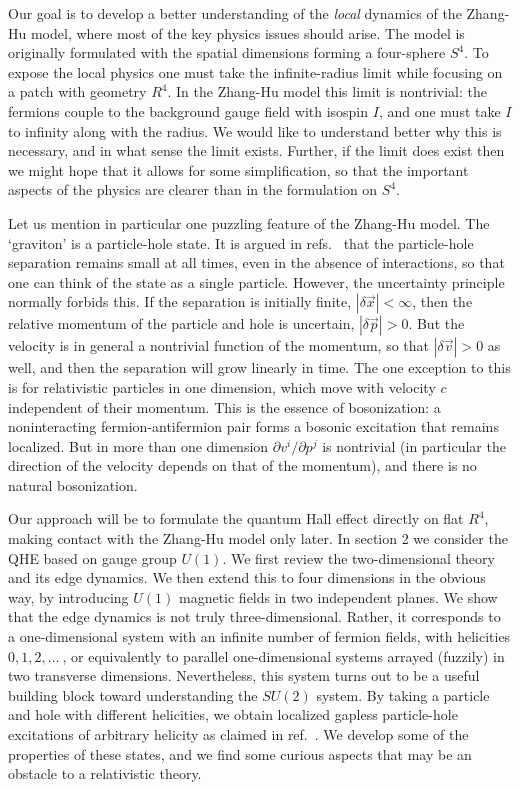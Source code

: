 \documentclass[a4paper,12pt]{article}
\newcommand{\R}{R}
\begin{document}
Our goal is to develop a better understanding of the {\it local}
dynamics of the Zhang-Hu model, where most of the key
physics issues should arise.
The model is originally formulated with the spatial dimensions forming a
four-sphere $S^4$.  To expose the local physics one must take the
infinite-radius limit while focusing on a patch with geometry $\R^4$.
In the Zhang-Hu model this limit is nontrivial: the fermions couple to
the background gauge field with isospin $I$, and one must take $I$
to infinity along with the radius.  We would like to understand better why
this is necessary, and in what sense the limit exists.  Further, if the
limit does exist then we might hope that it allows for some simplification,
so that the important aspects of the physics are clearer than in the
formulation on $S^4$.

Let us mention in particular one puzzling feature of the Zhang-Hu model.
The `graviton' is a particle-hole state.  It is
argued in refs.~\cite{hz1,hz2} that the particle-hole separation remains
small at all times, even in the absence of interactions, so that one can
think of the state as a single particle.  
However, the uncertainty principle normally forbids this.  If the separation
is initially finite, $|\delta \vec x| < \infty$, then the relative
momentum of the particle and hole is uncertain, $|\delta \vec p| > 0$.  But
the velocity is in general a nontrivial function of the momentum, so that
$|\delta \vec v| > 0$ as well, and then the separation will grow linearly in
time.  The one exception to this is for relativistic particles in one
dimension, which move with velocity $c$ independent of their momentum.
This is the essence of bosonization: a noninteracting fermion-antifermion pair
forms a bosonic excitation that remains localized.  But in more than one
dimension $\partial v^i/\partial p^j$ is nontrivial (in particular the
direction of the velocity depends on that of the momentum), and there is no
natural bosonization.

Our approach will be to formulate the quantum Hall effect directly on flat
$\R^4$, making contact with the Zhang-Hu model only later.  In section 2 we
consider the QHE based on gauge group $U(1)$.  We first review the
two-dimensional theory and its edge dynamics.  We then extend this to four
dimensions in the obvious way, by introducing $U(1)$ magnetic fields in two
independent planes.  We show that the edge dynamics is not truly
three-dimensional.  Rather, it corresponds to a one-dimensional system with
an infinite number of fermion fields, with helicities $0,1,2,\ldots\ $, or
equivalently to parallel one-dimensional systems arrayed (fuzzily) in two
transverse dimensions.  Nevertheless, this system turns out to be a useful
building block toward understanding the $SU(2)$ system.  By taking a particle
and hole with different helicities, we obtain localized gapless
particle-hole excitations of arbitrary helicity as claimed in ref.~\cite{hz1}. 
We develop some of the properties of these states, and we find some curious
aspects that may be an obstacle to a relativistic theory.
\end{document}

